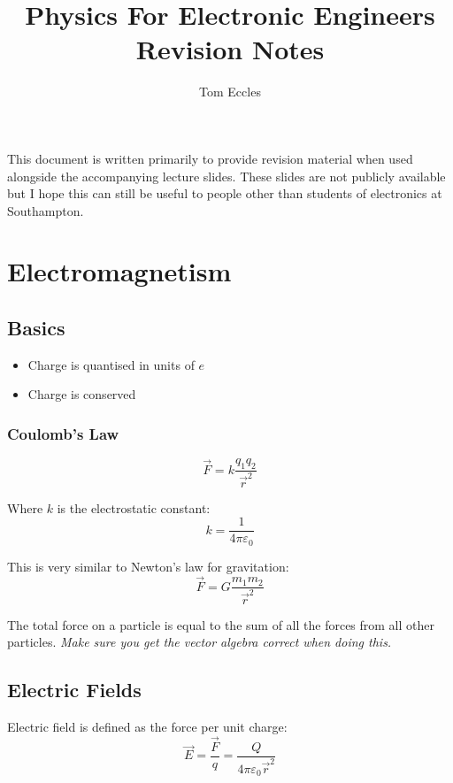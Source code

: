 \documentclass[11pt,a4paper]{report}
\title{Physics For Electronic Engineers Revision Notes}
\author{Tom Eccles}
\begin{document}
\maketitle
This document is written primarily to provide revision material when used alongside the accompanying lecture slides. These slides are not publicly available but I hope this can still be useful to people other than students of electronics at Southampton. 
\tableofcontents
\pagebreak
\chapter{Electromagnetism}
\section{Basics}
\begin{itemize}
\item Charge is quantised in units of $e$
\item Charge is conserved
\end{itemize}

\subsection{Coulomb's Law}
\begin{equation*}
	\vec{F} = k\frac{q_1q_2}{\vec{r}^2}
\end{equation*}

Where $k$ is the electrostatic constant:
\begin{equation*}
	k = \frac{1}{4\pi\varepsilon_0}
\end{equation*}

This is very similar to Newton's law for gravitation:
\begin{equation*}
	\vec{F}=G\frac{m_1m_2}{\vec{r}^2}
\end{equation*}

The total force on a particle is equal to the sum of all the forces from all other particles. \textit{Make sure you get the vector algebra correct when doing this.}

\section{Electric Fields}
Electric field is defined as the force per unit charge:
\begin{equation*}
	\vec{E} = \frac{\vec{F}}{q} = \frac{Q}{4\pi\varepsilon_0 \vec{r}^2}
\end{equation*}
\end{document}

